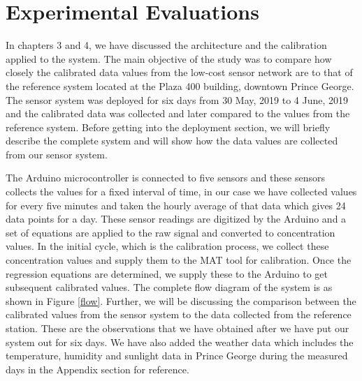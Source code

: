 \chapter{Experimental Evaluations}

In chapters 3 and 4, we have discussed the architecture and the calibration applied to the system.  The main objective of the study was to compare how closely the calibrated data values from the low-cost sensor network are to that of the reference system located at the Plaza 400 building, downtown Prince George. The sensor system was deployed for six days from 30 May, 2019 to 4 June, 2019 and the calibrated data was collected and later compared to the values from the reference system. Before getting into the deployment section, we will briefly describe the complete system and will show how the data values are collected from our sensor system.



The Arduino microcontroller is connected to five sensors and these sensors collects the values for a fixed interval of time, in our case we have collected values for every five minutes and taken the hourly average of that data which gives 24 data points for a day. These sensor readings are digitized by the Arduino and a set of equations are applied to the raw signal and converted to concentration values. In the initial cycle, which is the calibration process, we collect these concentration values and supply them to the MAT tool for calibration. Once the regression equations are determined, we supply these to the Arduino to get subsequent calibrated values. The complete flow diagram of the system is as shown in Figure \ref{flow}. Further, we will be discussing the comparison between the calibrated values from the sensor system to the data collected from the reference station. 
These are the observations that we have obtained after we have put our system out for six days. We have also added the weather data which includes the temperature, humidity and sunlight data in Prince George during the measured days in the Appendix section for reference.




